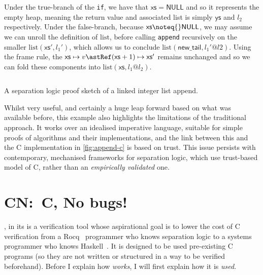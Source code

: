 Under the true-branch of the \texttt{if}, we have that $\mathsf{xs} =
\mathsf{NULL}$ and so it represents the empty heap, meaning the return value
and associated  list is simply $\mathsf{ys}$ and $l_2$ respectively.
Under the false-branch, because $\mathsf{xs} \noteq{} \mathsf{NULL}$, we may
assume we can unroll the definition of $\mathrm{list}$, before calling
\texttt{append} recursively on the smaller
$\mathrm{list}(\mathsf{xs}', l_1')$, which allows us to conclude
$\mathrm{list}(\mathsf{new\_tail}, l_1' @ l2)$. Using the frame rule, the
$\mathsf{xs} \mapsto v \astRef (\mathsf{xs} + 1) \mapsto \mathsf{xs}'$ remains
unchanged and so we can fold these components into $\mathrm{list}(\mathsf{xs},
l_1 @ l_2)$.

\begin{marginfigure}
    \inputminted[breaklines,mathescape,fontsize=\small]{py}{code/append_annot.py}
    \caption{A separation logic proof sketch of a linked integer list
        append.}\label{fig:append-annot}
\end{marginfigure}

Whilst very useful, and certainly a huge leap forward based on what was
available before, this example also highlights the limitations of the
traditional approach. It works over an idealised imperative language, suitable
for simple proofs of algorithms and their implementations, and the link between
this and the C implementation in \cref{fig:append-c} is based on trust. This
issue persists with contemporary, mechanised frameworks for separation
logic,
which use trust-based model of C, rather than an \emph{empirically validated}
one.

\section{CN:\ C, No bugs!}\label{sec:cn-intro}

, in its  is a verification tool whose aspirational goal is to lower the cost of
C verification from a Rocq~ programmer who knows separation
logic to a systems programmer who knows
Haskell~. It is designed to be used pre-existing C programs (so they are
not written or structured in a way to be verified beforehand). Before I explain
how \emph{works}, I will first explain how it is \emph{used}.

